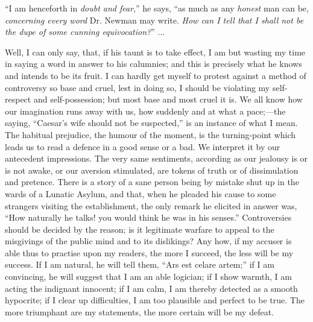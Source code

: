 ``I am henceforth in \emph{doubt and fear},'' he says,
``as much as any \emph{honest} man can be, \emph{concerning every
word} Dr. Newman may write. \emph{How can I tell that I shall not be
the dupe of some cunning equivocation?}'' ...

Well, I can only say, that, if his taunt is to take effect, I am
but wasting my time in saying a word in answer to his calumnies;
and this is precisely what he knows and intends to be its fruit. I can
hardly get myself to protest against a method of controversy so base
and cruel, lest in doing so, I should be violating my self-respect and
self-possession; but most base and most cruel it is. We all know how
our imagination runs away with us, how suddenly and at what a pace;—the
saying, ``Caesar's wife should not be suspected,'' is an
instance of what I mean. The habitual prejudice, the humour of the
moment, is the turning-point which leads us to read a defence in a
good sense or a bad. We interpret it by our antecedent impressions.
The very same sentiments, according as our jealousy is or is not
awake, or our aversion stimulated, are tokens of truth or of
dissimulation and pretence. There is a story of a sane person being by
mistake shut up in the wards of a Lunatic Asylum, and that, when he
pleaded his cause to some strangers visiting the establishment, the
only remark he elicited in answer was, ``How naturally he talks! you
would think he was in his senses.'' Controversies should be
decided by the reason; is it legitimate warfare to appeal to the
misgivings of the public mind and to its dislikings? Any how, if my
accuser is able thus to practise upon my readers, the more I succeed,
the less will be my success. If I am natural, he will tell them,
``Ars est celare artem;'' if I am convincing, he will suggest
that I am an able logician; if I show warmth, I am acting the
indignant innocent; if I am calm, I am thereby detected as a smooth
hypocrite; if I clear up difficulties, I am too plausible and perfect
to be true. The more triumphant are my statements, the more certain
will be my defeat.

